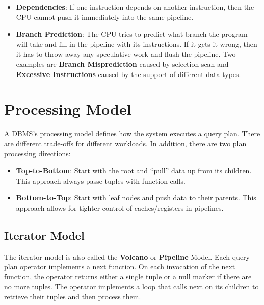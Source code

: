\documentclass[11pt]{article}
\begin{document}
\begin{itemize}
	\item \textbf{Dependencies}: 
	If one instruction depends on another instruction, 
	then the CPU cannot push it immediately into the same pipeline. 
	
	\item \textbf{Branch Prediction}: 
	The CPU tries to predict what branch the program will take and fill in the pipeline with its 
	instructions. If it gets it wrong, then it has to throw away any speculative work and flush the 
	pipeline. Two examples are \textbf{Branch Misprediction} caused by selection scan and 
	\textbf{Excessive Instructions} caused by the support of different data types.
\end{itemize}

\section{Processing Model}
A DBMS's processing model defines how the system executes a query plan. There are different 
trade-offs for different workloads. In addition, there are two plan processing directions:
\begin{itemize}
	\item \textbf{Top-to-Bottom}: 
	Start with the root and ``pull'' data up from its children. 
	This approach always passe tuples with function calls.
	\item \textbf{Bottom-to-Top}: 
	Start with leaf nodes and push data to their parents. 
	This approach allows for tighter control of caches/registers in pipelines.
\end{itemize} 


\subsection{Iterator Model}
The iterator model is also called the \textbf{Volcano} or \textbf{Pipeline} Model. Each query plan 
operator implements a next function. On each invocation of the next function, the operator returns 
either a single tuple or a null marker if there are no more tuples. The operator implements a loop 
that calls next on its children to retrieve their tuples and then process them.
\end{document}
